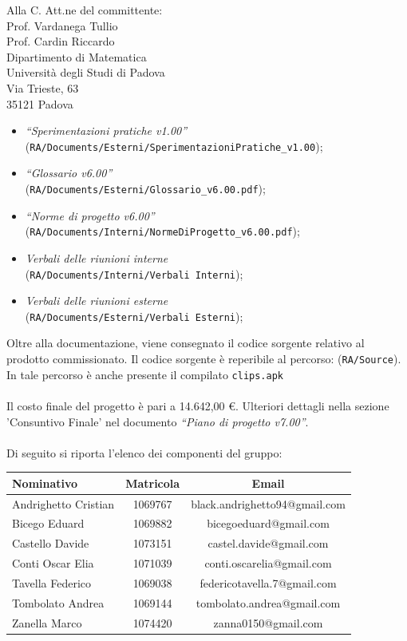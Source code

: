 \documentclass[a4paper,12pt]{letteracdp}
\begin{document}
\begin{letter}{
		Alla C. Att.ne del committente: \\
		Prof. Vardanega Tullio \\
		Prof. Cardin Riccardo \\
		Dipartimento di Matematica \\
		Università degli Studi di Padova \\
		Via Trieste, 63 \\
		35121 Padova}
\begin{itemize}
	\item \textit{“Sperimentazioni pratiche v1.00”} \\(\texttt{RA/Documents/Esterni/SperimentazioniPratiche\_v1.00});
	
	\item \textit{“Glossario v6.00”} \\(\texttt{RA/Documents/Esterni/Glossario\_v6.00.pdf});
	
	\item \textit{“Norme di progetto v6.00”} \\(\texttt{RA/Documents/Interni/NormeDiProgetto\_v6.00.pdf});

	\item \textit{Verbali delle riunioni interne}	\\(\texttt{RA/Documents/Interni/Verbali Interni});
	
	\item \textit{Verbali delle riunioni esterne}	\\(\texttt{RA/Documents/Esterni/Verbali Esterni});
		
\end{itemize}

Oltre alla documentazione, viene consegnato il codice sorgente relativo al prodotto commissionato. Il codice sorgente è reperibile al percorso: (\texttt{RA/Source}). In tale percorso è anche presente il compilato \texttt{clips.apk}\\ \\
Il costo finale del progetto è pari a 14.642,00 \euro. Ulteriori dettagli nella sezione 'Consuntivo Finale' nel documento \textit{“Piano di progetto v7.00”}.\\ \\
Di seguito si riporta l'elenco dei componenti del gruppo:

\begin{center}
		\begin{tabular}{l c c}
			\toprule
			\textbf{Nominativo} & \textbf{Matricola} & \textbf{Email} \\
			\midrule
			Andrighetto Cristian & 1069767 & black.andrighetto94@gmail.com \\
			Bicego Eduard & 1069882 & bicegoeduard@gmail.com  \\
			Castello Davide	& 1073151 &	 castel.davide@gmail.com\\
			Conti Oscar Elia & 1071039 & conti.oscarelia@gmail.com \\
			Tavella Federico & 1069038 & federicotavella.7@gmail.com\\
			Tombolato Andrea & 1069144 & tombolato.andrea@gmail.com	 \\
			Zanella Marco & 1074420 & zanna0150@gmail.com \\
			\bottomrule
		\end{tabular}
\end{center}
		

\end{letter}
\end{document}
